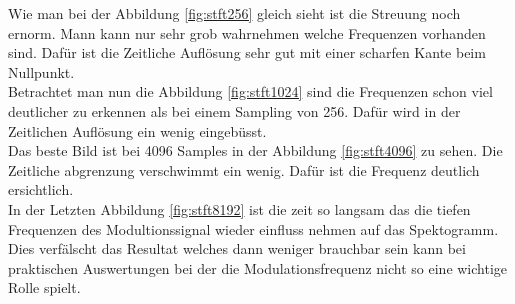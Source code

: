 Wie man bei der Abbildung \ref{fig:stft256} gleich sieht ist die Streuung noch ernorm. Mann kann nur sehr grob wahrnehmen welche Frequenzen vorhanden sind. Dafür ist die Zeitliche Auflösung sehr gut mit einer scharfen Kante beim Nullpunkt. \\

Betrachtet man nun die Abbildung \ref{fig:stft1024} sind die Frequenzen schon viel deutlicher zu erkennen als bei einem Sampling von 256. Dafür wird in der Zeitlichen Auflösung ein wenig eingebüsst.\\

Das beste Bild ist bei 4096 Samples in der Abbildung \ref{fig:stft4096} zu sehen. Die Zeitliche abgrenzung verschwimmt ein wenig. Dafür ist die Frequenz deutlich ersichtlich.\\

In der Letzten Abbildung \ref{fig:stft8192} ist die zeit so langsam das die tiefen Frequenzen des Modultionssignal wieder einfluss nehmen auf das Spektogramm. Dies verfälscht das Resultat welches dann weniger brauchbar sein kann bei praktischen Auswertungen bei der die Modulationsfrequenz nicht so eine wichtige Rolle spielt.\\






